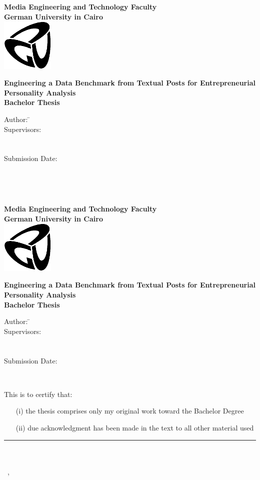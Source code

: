 
\newcommand{\titlePage}{

\thispagestyle{empty}

\begin{center}
	\textbf{Media Engineering and Technology Faculty}\\[1mm]
	\textbf{German University in Cairo}\\[1mm]
	\includegraphics[width=2.5cm]{GUC-logo-ss.eps}

	\vspace{2cm}
	\doublespacing
	{\Huge \textbf{Engineering a Data Benchmark from Textual Posts for Entrepreneurial Personality Analysis}}\\
	\singlespacing
	\vspace{2cm}
	{\large \textbf{Bachelor Thesis}}\\

	\vfill
	\parbox{1cm}{
  			\begin{large}
    			\begin{tabbing}
       			Author: \hspace{2cm}  
        			\=\authorOfThesis\\[2mm]
      			Supervisors: 
	      		\>\supervisorOne\\[2mm]
				\>\supervisorTwo\\[2mm]
				\\
      			Submission Date: 
        			\>\submissionDate\\
    			\end{tabbing}
  		\end{large}
	}\\
\end{center}
\clearpage
}

%

\titlePage
\thispagestyle{empty}
\ \clearpage
\titlePage

\thispagestyle{empty}
This is to certify that:
\begin{itemize}
\item[(i)] the thesis comprises only my original work toward the Bachelor Degree
\item[(ii)] due acknowledgment has been made in the text to all other material used
\end{itemize}

\vspace{2cm}
\begin{flushright}
\rule[0mm]{6cm}{0.2mm}\\
\authorOfThesis\\
\submissionDay~\submissionMonth,~\submissionYear\\
\end{flushright}
\clearpage

%
